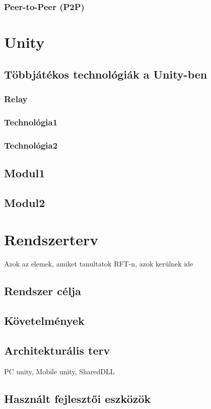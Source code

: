 \documentclass[]{thesis-ekf}
\theoremstyle{definition}
\theoremstyle{remark}
\begin{document}
\subsection{Peer-to-Peer (P2P)}

\chapter{Unity}

\section{Többjátékos technológiák a Unity-ben}

\subsection{Relay}
\subsection{Technológia1}
\subsection{Technológia2}

\section{Modul1}
\section{Modul2}

\chapter{Rendszerterv}
Azok az elemek, amiket tanultatok RFT-n, azok kerülnek ide

\section{Rendszer célja}
\section{Követelmények}
\section{Architekturális terv}
PC unity, Mobile unity, SharedDLL
\section{Használt fejlesztői eszközök}
\end{document}
